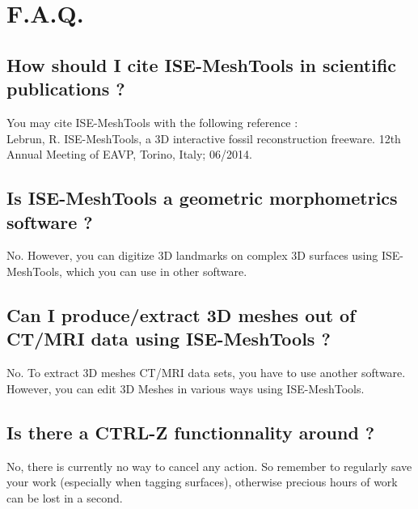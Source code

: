  \chapter{F.A.Q.}
  
    \section{How should I cite ISE-MeshTools in scientific publications ?}
    You may  cite ISE-MeshTools with the following reference :\\
		Lebrun, R. ISE-MeshTools, a 3D interactive fossil reconstruction freeware. 
		12th Annual Meeting of EAVP, Torino, Italy; 06/2014.
    \section{Is ISE-MeshTools a geometric morphometrics software ?}
    No. However, you can digitize 3D landmarks on complex 3D surfaces using ISE-MeshTools, which you 
		can use in other software.
		\section{Can I produce/extract 3D meshes out of CT/MRI data using ISE-MeshTools ?}
		No. To extract 3D meshes CT/MRI data sets, you have to use another software. However, you can edit 
		3D Meshes in various ways using ISE-MeshTools.
		\section{Is there a CTRL-Z functionnality around ?}
		No, there is currently no way to cancel any action. So remember to regularly save your work (especially when tagging surfaces), otherwise precious hours of work can be lost in a second.